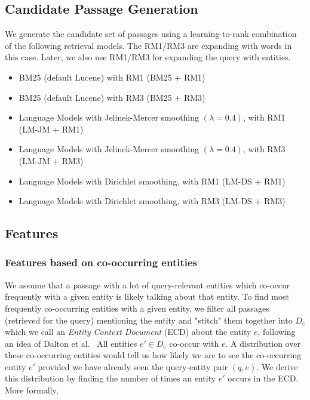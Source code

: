 \documentclass[sigconf]{acmart}
\newcommand{\todo}[1]{ \PackageWarning{TODO:}{#1!}}
\begin{document}
\subsection{Candidate Passage Generation}
\label{subsec:candidate passage generation}
We generate the candidate set of passages using a learning-to-rank combination of the following retrieval models. The RM1/RM3 are expanding with words in this case. Later, we also use RM1/RM3 for expanding the query with entities. 
\begin{itemize}
    \item BM25 (default Lucene) with RM1 (BM25 + RM1)
    \item BM25 (default Lucene) with RM3 (BM25 + RM3)
    \item Language Models with Jelinek-Mercer smoothing $(\lambda = 0.4)$, with RM1 (LM-JM + RM1)
    \item Language Models with Jelinek-Mercer smoothing $(\lambda = 0.4)$, with RM3 (LM-JM + RM3)
    \item Language Models with Dirichlet smoothing, with RM1 (LM-DS + RM1)
    \item Language Models with Dirichlet smoothing, with RM3 (LM-DS + RM3)
\end{itemize}


\subsection{Features}
\label{subsec:features}
\subsubsection{Features based on co-occurring entities}
\label{subsubsec:features:1}
We assume that a passage with a lot of query-relevant entities which co-occur frequently with a given entity is likely talking about that entity. To find most frequently co-occurring entities with a given entity, we filter all passages (retrieved for the query) mentioning the entity and "stitch" them together into $D_e$ which we call an \textit{Entity Context Document} (ECD) about the entity $e$, following an idea of Dalton et al.\ \cite{dalton2014entity} %
All entities $e' \in D_e$ co-occur with $e$. A distribution over these co-occurring entities would tell us how likely we are to see the co-occurring entity $e'$ provided we have already seen the query-entity pair $(q, e)$. We derive this distribution by finding the number of times an entity $e'$ occurs in the ECD. More formally, 
\end{document}
